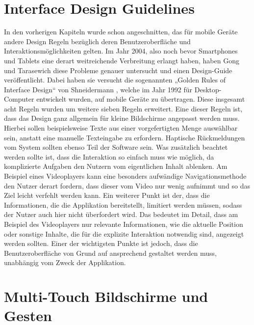 \documentclass[11pt,a4paper]{report}
\begin{document}
\section{Interface Design Guidelines}

In den vorherigen Kapiteln wurde schon angeschnitten, das für mobile Geräte andere Design Regeln bezüglich deren Benutzeroberfläche und Interaktionsmöglichkeiten gelten. Im Jahr 2004, also noch bevor Smartphones und Tablets eine derart weitreichende Verbreitung erlangt haben, haben Gong und Tarasewich \cite{gong2004guidelines} diese Probleme genauer untersucht und einen Design-Guide veröffentlicht. Dabei haben sie versucht die sogenannten „Golden Rules of Interface Design“ von Shneidermann \cite{shneiderman1992designing}, welche im Jahr 1992 für Desktop-Computer entwickelt wurden, auf mobile Geräte zu übertragen. Diese insgesamt acht Regeln wurden um weitere sieben Regeln erweitert. Eine dieser Regeln ist, dass das Design ganz allgemein für kleine Bildschirme angepasst werden muss. Hierbei sollen beispielsweise Texte aus einer vorgefertigten Menge auswählbar sein, anstatt eine manuelle Texteingabe zu erfordern. Haptische Rückmeldungen vom System sollten ebenso Teil der Software sein. Was zusätzlich beachtet werden sollte ist, dass die Interaktion so einfach muss wie möglich, da komplizierte Aufgaben den Nutzern vom eigentlichen Inhalt ablenken. Am Beispiel eines Videoplayers kann eine besonders aufwändige Navigationsmethode den Nutzer derart fordern, dass dieser vom Video nur wenig aufnimmt und so das Ziel leicht verfehlt werden kann. Ein weiterer Punkt ist der, dass die Informationen, die die Applikation bereitstellt, limitiert werden müssen, sodass der Nutzer auch hier nicht überfordert wird. Das bedeutet im Detail, dass am Beispiel des Videoplayers nur relevante Informationen, wie die aktuelle Position oder sonstige Inhalte, die für die explizite Interaktion notwendig sind, angezeigt werden sollten. Einer der wichtigsten Punkte ist jedoch, dass die Benutzeroberfläche von Grund auf ansprechend gestaltet werden muss, unabhängig vom Zweck der Applikation. \cite{gong2004guidelines}

\section{Multi-Touch Bildschirme und Gesten}
\end{document}
